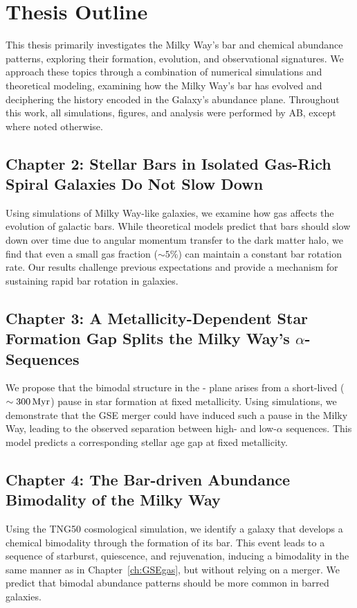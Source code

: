 \section{Thesis Outline}
\label{sec:thesis_outline}
This thesis primarily investigates the Milky Way's bar and chemical abundance patterns, exploring their formation, evolution, and observational signatures. We approach these topics through a combination of numerical simulations and theoretical modeling, examining how the Milky Way's bar has evolved and deciphering the history encoded in the Galaxy's abundance plane. Throughout this work, all simulations, figures, and analysis were performed by AB, except where noted otherwise.

\subsection*{Chapter 2: Stellar Bars in Isolated Gas-Rich Spiral Galaxies Do Not Slow Down}
Using simulations of Milky Way-like galaxies, we examine how gas affects the evolution of galactic bars. While theoretical models predict that bars should slow down over time due to angular momentum transfer to the dark matter halo, we find that even a small gas fraction ($\sim5\%$) can maintain a constant bar rotation rate. Our results challenge previous expectations and provide a mechanism for sustaining rapid bar rotation in galaxies.

\subsection*{Chapter 3: A Metallicity-Dependent Star Formation Gap Splits the Milky Way's $\alpha$-Sequences}
We propose that the bimodal structure in the \alphaFe{}-\FeH{} plane arises from a short-lived ($\sim300\,\textrm{Myr}$) pause in star formation at fixed metallicity. Using simulations, we demonstrate that the GSE merger could have induced such a pause in the Milky Way, leading to the observed separation between high- and low-$\alpha$ sequences. This model predicts a corresponding stellar age gap at fixed metallicity.

\subsection*{Chapter 4: The Bar-driven Abundance Bimodality of the Milky Way}
Using the TNG50 cosmological simulation, we identify a galaxy that develops a chemical bimodality through the formation of its bar. This event leads to a sequence of starburst, quiescence, and rejuvenation, inducing a bimodality in the same manner as in Chapter~\ref{ch:GSEgas}, but without relying on a merger. We predict that bimodal abundance patterns should be more common in barred galaxies.